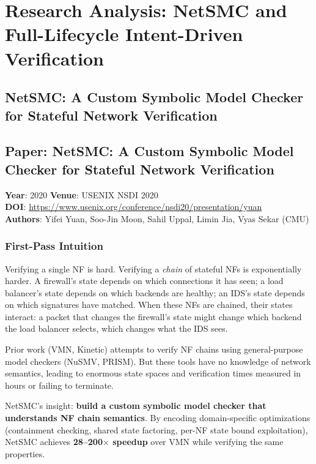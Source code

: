 
\section{Research Analysis: NetSMC and Full-Lifecycle Intent-Driven Verification}
\label{sec:netSMC-fulllifecycle}

\subsection{NetSMC: A Custom Symbolic Model Checker for Stateful Network Verification}

\subsection*{Paper: NetSMC: A Custom Symbolic Model Checker for Stateful Network Verification}
\textbf{Year}: 2020 \quad \textbf{Venue}: USENIX NSDI 2020\\
\textbf{DOI}: \url{https://www.usenix.org/conference/nsdi20/presentation/yuan}\\
\textbf{Authors}: Yifei Yuan, Soo-Jin Moon, Sahil Uppal, Limin Jia, Vyas Sekar (CMU)

\subsubsection{First-Pass Intuition}

Verifying a single NF is hard. Verifying a \emph{chain} of stateful NFs is exponentially harder. A firewall's state depends on which connections it has seen; a load balancer's state depends on which backends are healthy; an IDS's state depends on which signatures have matched. When these NFs are chained, their states interact: a packet that changes the firewall's state might change which backend the load balancer selects, which changes what the IDS sees.

Prior work (VMN, Kinetic) attempts to verify NF chains using general-purpose model checkers (NuSMV, PRISM). But these tools have no knowledge of network semantics, leading to enormous state spaces and verification times measured in hours or failing to terminate.

NetSMC's insight: \textbf{build a custom symbolic model checker that understands NF chain semantics}. By encoding domain-specific optimizations (containment checking, shared state factoring, per-NF state bound exploitation), NetSMC achieves \textbf{28--200$\times$ speedup} over VMN while verifying the same properties.

